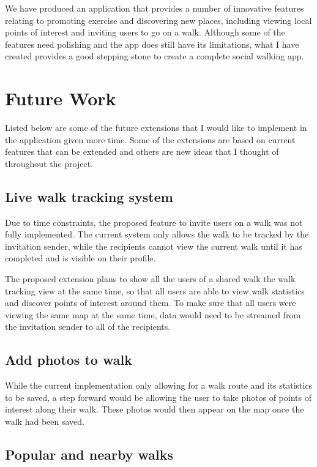 We have produced an application that provides a number of innovative features relating to promoting exercise and discovering new places, including viewing local points of interest and inviting users to go on a walk. Although some of the features need polishing and the app does still have its limitations, what I have created provides a good stepping stone to create a complete social walking app.

\section{Future Work} \label{section:future-work}

Listed below are some of the future extensions that I would like to implement in the application given more time. Some of the extensions are based on current features that can be extended and others are new ideas that I thought of throughout the project.

\subsection{Live walk tracking system} \label{subsection:live-walk-tracking-system}

Due to time constraints, the proposed feature to invite users on a walk was not fully implemented. The current system only allows the walk to be tracked by the invitation sender, while the recipients cannot view the current walk until it has completed and is visible on their profile.

The proposed extension plans to show all the users of a shared walk the walk tracking view at the same time, so that all users are able to view walk statistics and discover points of interest around them. To make sure that all users were viewing the same map at the same time, data would need to be streamed from the invitation sender to all of the recipients.

\subsection{Add photos to walk}

While the current implementation only allowing for a walk route and its statistics to be saved, a step forward would be allowing the user to take photos of points of interest along their walk. These photos would then appear on the map once the walk had been saved.

\subsection{Popular and nearby walks}


